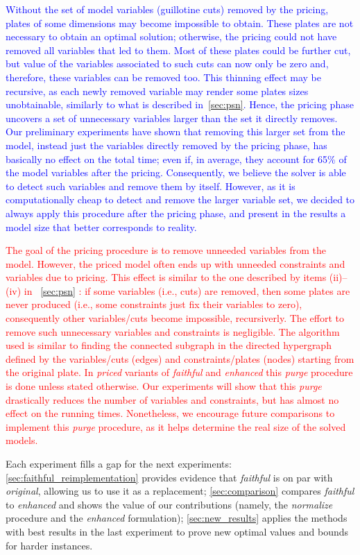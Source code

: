 \documentclass[smallextended]{svjour3}       %
\newif\iffinalversion
\newcommand{\newtext}[1]{\iffinalversion%
#1%
\else%
\textcolor{blue}{#1}%
\fi%
}
\newcommand{\oldtext}[1]{\iffinalversion%
#1%
\else%
\textcolor{red}{#1}%
\fi%
}
\begin{document}
\newtext{Without the set of model variables (guillotine cuts) removed by the pricing, plates of some dimensions may become impossible to obtain. These plates are not necessary to obtain an optimal solution; otherwise, the pricing could not have removed all variables that led to them. Most of these plates could be further cut, but value of the variables associated to such cuts can now only be zero and, therefore, these variables can be removed too. This thinning effect may be recursive, as each newly removed variable may render some plates sizes unobtainable, similarly to what is described in~\autoref{sec:psn}. Hence, the pricing phase uncovers a set of unnecessary variables larger than the set it directly removes. Our preliminary experiments have shown that removing this larger set from the model, instead just the variables directly removed by the pricing phase, has basically no effect on the total time; even if, in average, they account for 65\% of the model variables after the pricing. Consequently, we believe the solver is able to detect such variables and remove them by itself. However, as it is computationally cheap to detect and remove the larger variable set, we decided to always apply this procedure after the pricing phase, and present in the results a model size that better corresponds to reality.}
\oldtext{The goal of the pricing procedure is to remove unneeded variables from the model. However, the priced model often ends up with unneeded constraints and variables due to pricing. This effect is similar to the one described by items (ii)--(iv) in}~\autoref{sec:psn}\oldtext{: if some variables (i.e., cuts) are removed, then some plates are never produced (i.e., some constraints just fix their variables to zero), consequently other variables/cuts become impossible, recursiverly. The effort to remove such unnecessary variables and constraints is negligible. The algorithm used is similar to finding the connected subgraph in the directed hypergraph defined by the variables/cuts (edges) and constraints/plates (nodes) starting from the original plate. In \emph{priced} variants of \emph{faithful} and \emph{enhanced} this \emph{purge} procedure is done unless stated otherwise. Our experiments will show that this \emph{purge} drastically reduces the number of variables and constraints, but has almost no effect on the running times. Nonetheless, we encourage future comparisons to implement this \emph{purge} procedure, as it helps determine the real size of the solved models.}

Each experiment fills a gap for the next experiments:%
\autoref{sec:faithful_reimplementation} provides evidence that \emph{faithful} is on par with \emph{original}, allowing us to use it as a replacement;
\autoref{sec:comparison} compares \emph{faithful} to \emph{enhanced} and shows the value of our contributions (namely, the \emph{normalize} procedure and the \emph{enhanced} formulation);
\autoref{sec:new_results} applies the methods with best results in the last experiment to prove new optimal values and bounds for harder instances.
\end{document}
